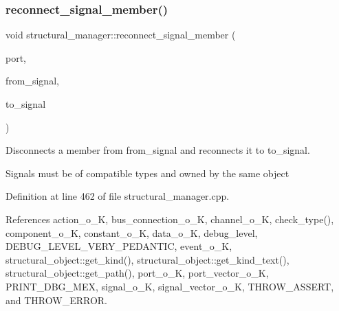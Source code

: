 \subsubsection{\texorpdfstring{reconnect\+\_\+signal\+\_\+member()}{reconnect\_signal\_member()}}
{\footnotesize\ttfamily void structural\+\_\+manager\+::reconnect\+\_\+signal\+\_\+member (\begin{DoxyParamCaption}\item[{\hyperlink{structural__objects_8hpp_a8ea5f8cc50ab8f4c31e2751074ff60b2}{structural\+\_\+object\+Ref} \&}]{port,  }\item[{\hyperlink{structural__objects_8hpp_a8ea5f8cc50ab8f4c31e2751074ff60b2}{structural\+\_\+object\+Ref} \&}]{from\+\_\+signal,  }\item[{\hyperlink{structural__objects_8hpp_a8ea5f8cc50ab8f4c31e2751074ff60b2}{structural\+\_\+object\+Ref} \&}]{to\+\_\+signal }\end{DoxyParamCaption})}



Disconnects a member from from\+\_\+signal and reconnects it to to\+\_\+signal. 

Signals must be of compatible types and owned by the same object 

Definition at line 462 of file structural\+\_\+manager.\+cpp.



References action\+\_\+o\+\_\+K, bus\+\_\+connection\+\_\+o\+\_\+K, channel\+\_\+o\+\_\+K, check\+\_\+type(), component\+\_\+o\+\_\+K, constant\+\_\+o\+\_\+K, data\+\_\+o\+\_\+K, debug\+\_\+level, D\+E\+B\+U\+G\+\_\+\+L\+E\+V\+E\+L\+\_\+\+V\+E\+R\+Y\+\_\+\+P\+E\+D\+A\+N\+T\+IC, event\+\_\+o\+\_\+K, structural\+\_\+object\+::get\+\_\+kind(), structural\+\_\+object\+::get\+\_\+kind\+\_\+text(), structural\+\_\+object\+::get\+\_\+path(), port\+\_\+o\+\_\+K, port\+\_\+vector\+\_\+o\+\_\+K, P\+R\+I\+N\+T\+\_\+\+D\+B\+G\+\_\+\+M\+EX, signal\+\_\+o\+\_\+K, signal\+\_\+vector\+\_\+o\+\_\+K, T\+H\+R\+O\+W\+\_\+\+A\+S\+S\+E\+RT, and T\+H\+R\+O\+W\+\_\+\+E\+R\+R\+OR.

